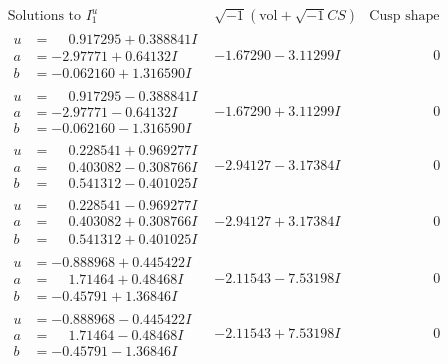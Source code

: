 \documentclass[1p]{elsarticle_modified}
\theoremstyle{definition}
\newcommand{\I}{\sqrt{-1}}
\begin{document}
$$\begin{array}{c|c|c}  
\text{Solutions to }I^u_{1}& \I (\text{vol} + \sqrt{-1}CS) & \text{Cusp shape}\\
 \hline 
\begin{aligned}
u &= \phantom{-}0.917295 + 0.388841 I \\
a &= -2.97771 + 0.64132 I \\
b &= -0.062160 + 1.316590 I\end{aligned}
 & -1.67290 - 3.11299 I & \phantom{-0.000000 } 0 \\ \hline\begin{aligned}
u &= \phantom{-}0.917295 - 0.388841 I \\
a &= -2.97771 - 0.64132 I \\
b &= -0.062160 - 1.316590 I\end{aligned}
 & -1.67290 + 3.11299 I & \phantom{-0.000000 } 0 \\ \hline\begin{aligned}
u &= \phantom{-}0.228541 + 0.969277 I \\
a &= \phantom{-}0.403082 - 0.308766 I \\
b &= \phantom{-}0.541312 - 0.401025 I\end{aligned}
 & -2.94127 - 3.17384 I & \phantom{-0.000000 } 0 \\ \hline\begin{aligned}
u &= \phantom{-}0.228541 - 0.969277 I \\
a &= \phantom{-}0.403082 + 0.308766 I \\
b &= \phantom{-}0.541312 + 0.401025 I\end{aligned}
 & -2.94127 + 3.17384 I & \phantom{-0.000000 } 0 \\ \hline\begin{aligned}
u &= -0.888968 + 0.445422 I \\
a &= \phantom{-}1.71464 + 0.48468 I \\
b &= -0.45791 + 1.36846 I\end{aligned}
 & -2.11543 - 7.53198 I & \phantom{-0.000000 } 0 \\ \hline\begin{aligned}
u &= -0.888968 - 0.445422 I \\
a &= \phantom{-}1.71464 - 0.48468 I \\
b &= -0.45791 - 1.36846 I\end{aligned}
 & -2.11543 + 7.53198 I & \phantom{-0.000000 } 0 \\ \hline\begin{aligned}

\end{aligned}
\end{array}$$
\end{document}
